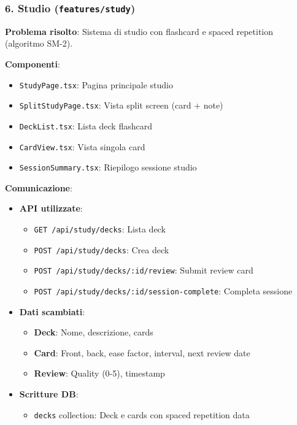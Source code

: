 \documentclass[11pt,a4paper]{article}
\begin{document}
\subsubsection{6. Studio (\texttt{features/study})}

\textbf{Problema risolto}: Sistema di studio con flashcard e spaced repetition (algoritmo SM-2).

\textbf{Componenti}:
\begin{itemize}
    \item \texttt{StudyPage.tsx}: Pagina principale studio
    \item \texttt{SplitStudyPage.tsx}: Vista split screen (card + note)
    \item \texttt{DeckList.tsx}: Lista deck flashcard
    \item \texttt{CardView.tsx}: Vista singola card
    \item \texttt{SessionSummary.tsx}: Riepilogo sessione studio
\end{itemize}

\textbf{Comunicazione}:
\begin{itemize}
    \item \textbf{API utilizzate}: 
    \begin{itemize}
        \item \texttt{GET /api/study/decks}: Lista deck
        \item \texttt{POST /api/study/decks}: Crea deck
        \item \texttt{POST /api/study/decks/:id/review}: Submit review card
        \item \texttt{POST /api/study/decks/:id/session-complete}: Completa sessione
    \end{itemize}
    \item \textbf{Dati scambiati}: 
    \begin{itemize}
        \item \textbf{Deck}: Nome, descrizione, cards
        \item \textbf{Card}: Front, back, ease factor, interval, next review date
        \item \textbf{Review}: Quality (0-5), timestamp
    \end{itemize}
    \item \textbf{Scritture DB}: 
    \begin{itemize}
        \item \texttt{decks} collection: Deck e cards con spaced repetition data
    \end{itemize}
\end{itemize}
\end{document}

